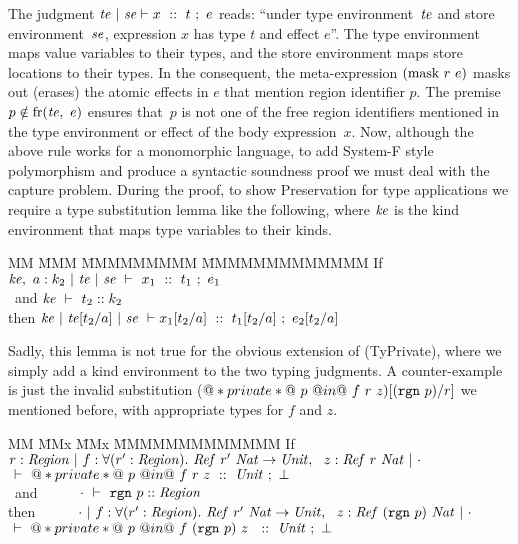 The judgment $\mathit{te} ~|~ \mathit{se} \vdash x ~::~ t ~;~ e$ reads: ``under type environment~$\mathit{te}$ and store environment~$\mathit{se}$, expression $x$ has type $t$ and effect $e$''. The type environment maps value variables to their types, and the store environment maps store locations to their types. In the consequent, the meta-expression $(\textrm{mask}~ r~ e)$ masks out (erases) the atomic effects in $e$ that mention region identifier $p$. The premise $p \notin \textrm{fr}(\mathit{te},~ e)$ ensures that~$p$ is not one of the free region identifiers mentioned in the type environment or effect of the body expression~$x$. Now, although the above rule works for a monomorphic language, to add System-F style polymorphism and produce a syntactic soundness proof we must deal with the capture problem. During the proof, to show Preservation for type applications we require a type substitution lemma like the following, where $\mathit{ke}$ is the kind environment that maps type variables to their kinds.
\begin{tabbing}
MM \= MMM \= MMMMMMMMM \= MMMMMMMMMMMMM \kill
\> If           \> $\mathit{ke},~ a : k_2 ~|~ \mathit{te} ~|~ \mathit{se} ~\vdash~ x_1 ~::~ t_1 ~;~ e_1$      \\
\>  ~and        \> $\mathit{ke} ~\vdash~ t_2 :: k_2$                                   \\
\> then         \> $\mathit{ke} ~|~ \mathit{te}[t_2/a] ~|~ \mathit{se}
                                ~\vdash x_1[t_2/a] 
                                ~::~ t_1[t_2/a] ~;~ e_2[t_2/a]$
\end{tabbing}

Sadly, this lemma is not true for the obvious extension of (TyPrivate), where we simply add a kind environment to the two typing judgments. A counter-example is just the invalid substitution ($@*private*@~ p~ @in@ ~f ~r~ z)[(\texttt{rgn}~ p)/r]$ we mentioned before, with appropriate types for $f$ and $z$. 

\begin{tabbing}
MM \= MMx \= MMx \= MMMMMMMMMMMMM \kill
\> If           \> \hspace{-1.3em}$r : \mathit{Region} 
                        ~|~ f : \forall (r' : \mathit{Region}).~ \mathit{Ref}~ r'~ \mathit{Nat} \to \mathit{Unit},~~
                            z : \mathit{Ref}~ r~ \mathit{Nat} ~|~ \cdot$ \\
\>              \>      \> $~\vdash~ @*private*@~ p~ @in@~ f~ r~ z ~::~ \mathit{Unit} ~;~ \bot$      
\\[0.5ex]
\>  ~and        \> $~~~~~~~~\cdot ~\vdash~ \texttt{rgn}~ p :: \mathit{Region}$                                   
\\[0.5ex]
\> then         \> $~~~~~~~~\cdot
                        ~|~ f : \forall (r' : \mathit{Region}).~ \mathit{Ref}~ r'~ \mathit{Nat} \to \mathit{Unit},~~
                            z : \mathit{Ref}~ (\texttt{rgn}~ p)~ \mathit{Nat} ~|~ \cdot$ \\
\>              \>      \> $~\vdash~ @*private*@~ p~ @in@~ f~ (\texttt{rgn}~ p)~ z~ ~::~ \mathit{Unit} ~;~ \bot$
\end{tabbing}

